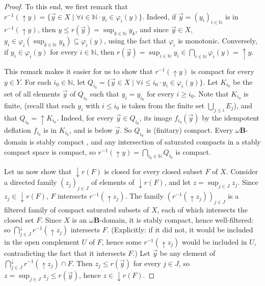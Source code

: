\documentclass{LMCS}
\newcommand\nat{\mathbb{N}}
\newcommand\upc{\mathop{\uparrow}\nolimits}
\newcommand\dc{\mathop{\downarrow}\nolimits}
\newcommand\B{\mathbf{B}}
\begin{document}
\begin{proof}
  To this end, we first remark that $r^{-1} (\upc y) = \{\vec y \in X
  \mid \forall i \in \nat \cdot y_i \in \varphi_i (y)\}$.  Indeed, if
  $\vec y = {(y_i)}_{i \in \nat}$ is in $r^{-1} (\upc y)$, then $y
  \leq r (\vec y) = \sup_{k \in \nat} y_k$, and since $\vec y \in X$,
  $y_i \in \varphi_i (\sup_{k \in \nat} y_k) \subseteq \varphi_i (y)$,
  using the fact that $\varphi_i$ is monotonic.  Conversely, if $y_i
  \in \varphi_i (y)$ for every $i \in \nat$, then $r (\vec y) =
  \sup_{i \in \nat} y_i \in \bigcap_{i \in \nat} \varphi_i (y) = \upc
  y$.

  This remark makes it easier for us to show that $r^{-1} (\upc y)$ is
  compact for every $y \in Y$.  For each $i_0 \in \nat$, let $Q_{i_0}
  = \{\vec y \in X \mid \forall i \leq i_0 \cdot y_i \in \varphi_i
  (y)\}$.  Let $K_{i_0}$ be the set of all elements $\vec y$ of
  $Q_{i_0}$ such that $y_i = y_{i_0}$ for every $i \geq i_0$.  Note
  that $K_{i_0}$ is finite, (recall that each $y_i$ with $i \leq i_0$
  is taken from the finite set $\bigcup_{j \leq i} E_j$), and that
  $Q_{i_0} = \upc K_{i_0}$.  Indeed, for every $\vec y \in Q_{i_0}$,
  its image $f_{i_0} (\vec y)$ by the idempotent deflation $f_{i_0}$
  is in $K_{i_0}$, and is below $\vec y$.  So $Q_{i_0}$ is (finitary)
  compact.  Every $\omega\B$-domain is stably compact
  \cite[Theorem~4.2.18]{AJ:domains}, and any intersection of saturated
  compacts in a stably compact space is compact, so $r^{-1} (\upc y) =
  \bigcap_{i_0 \in \nat} Q_{i_0}$ is compact.

  Let us now show that $\dc r (F)$ is closed for every closed subset
  $F$ of $X$.  Consider a directed family ${(z_j)}_{j \in J}$ of
  elements of $\dc r (F)$, and let $z = \sup_{j \in J} z_j$.  Since
  $z_j \in \dc r (F)$, $F$ intersects $r^{-1} (\upc z_j)$.  The family
  ${(r^{-1} (\upc z_j))}_{j \in J}$ is a filtered family of compact
  saturated subsets of $X$, each of which intersects the closed set
  $F$.  Since $X$ is an $\omega\B$-domain, it is stably compact, hence
  well-filtered: so $\bigcap^\downarrow_{j \in J} r^{-1} (\upc z_j)$
  intersects $F$.  (Explicitly: if it did not, it would be included in
  the open complement $U$ of $F$, hence some $r^{-1} (\upc z_j)$ would
  be included in $U$, contradicting the fact that it intersects $F$.)
  Let $\vec y$ be any element of $\bigcap^\downarrow_{j \in J} r^{-1}
  (\upc z_j) \cap F$.  Then $z_j \leq r (\vec y)$ for every $j \in J$,
  so $z = \sup_{j \in J} z_j \leq r (\vec y)$, hence $z \in \dc r
  (F)$.
\end{proof}
\end{document}
